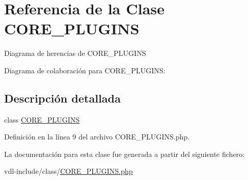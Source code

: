 \hypertarget{classCORE__PLUGINS}{\section{Referencia de la Clase C\-O\-R\-E\-\_\-\-P\-L\-U\-G\-I\-N\-S}
\label{classCORE__PLUGINS}
}


Diagrama de herencias de C\-O\-R\-E\-\_\-\-P\-L\-U\-G\-I\-N\-S


Diagrama de colaboración para C\-O\-R\-E\-\_\-\-P\-L\-U\-G\-I\-N\-S\-:


\subsection{Descripción detallada}
class \hyperlink{classCORE__PLUGINS}{C\-O\-R\-E\-\_\-\-P\-L\-U\-G\-I\-N\-S} 

Definición en la línea 9 del archivo C\-O\-R\-E\-\_\-\-P\-L\-U\-G\-I\-N\-S.\-php.



La documentación para esta clase fue generada a partir del siguiente fichero\-:\begin{DoxyCompactItemize}
\item 
vdl-\/include/class/\hyperlink{CORE__PLUGINS_8php}{C\-O\-R\-E\-\_\-\-P\-L\-U\-G\-I\-N\-S.\-php}\end{DoxyCompactItemize}
